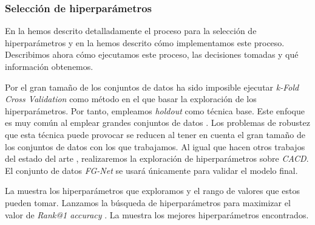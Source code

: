 \subsubsection{Selección de hiperparámetros} \label{isec:experimentacion_hp_tuning}

En la  hemos descrito detalladamente el proceso para la selección de hiperparámetros y en la  hemos descrito cómo implementamos este proceso. Describimos ahora cómo ejecutamos este proceso, las decisiones tomadas y qué información obtenemos.

Por el gran tamaño de los conjuntos de datos ha sido imposible ejecutar \textit{k-Fold Cross Validation} como método en el que basar la exploración de los hiperparámetros. Por tanto, empleamos \textit{holdout} como técnica base. Este enfoque es muy común al emplear grandes conjuntos de datos \cite{informatica:facenet} \cite{informatica:principal}. Los problemas de robustez que esta técnica puede provocar se reducen al tener en cuenta el gran tamaño de los conjuntos de datos con los que trabajamos. Al igual que hacen otros trabajos del estado del arte \cite{informatica:aim} \cite{informatica:dal}, realizaremos la exploración de hiperparámetros sobre \textit{CACD}. El conjunto de datos \textit{FG-Net} se usará únicamente para validar el modelo final.

La  muestra los hiperparámetros que exploramos y el rango de valores que estos pueden tomar. Lanzamos la búsqueda de hiperparámetros para maximizar el valor de \textit{Rank@1 accuracy} \footnotemark. La  muestra los mejores hiperparámetros encontrados.


